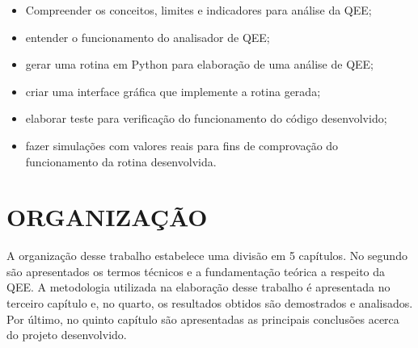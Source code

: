 \begin{itemize}
  \item Compreender os conceitos, limites e indicadores para análise da QEE;
  \item entender o funcionamento do analisador de QEE;
  \item gerar uma rotina em Python para elaboração de uma análise de QEE;
  \item criar uma interface gráfica que implemente a rotina gerada;
  \item elaborar teste para verificação do funcionamento do código desenvolvido;
  \item fazer simulações com valores reais para fins de comprovação do funcionamento da rotina desenvolvida.
\end{itemize}

\section{ORGANIZAÇÃO}

A organização desse trabalho estabelece uma divisão em 5 capítulos. No segundo são apresentados os termos técnicos e a fundamentação teórica a respeito da QEE. A metodologia utilizada na elaboração desse trabalho é apresentada no terceiro capítulo e, no quarto, os resultados obtidos são demostrados e analisados. Por último, no quinto capítulo são apresentadas as principais conclusões acerca do projeto desenvolvido.
